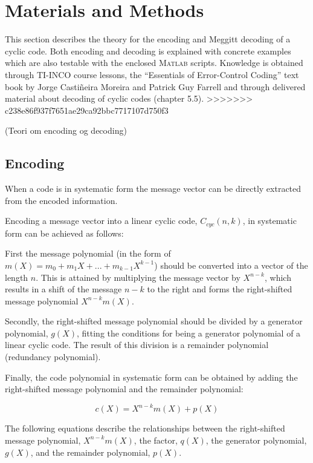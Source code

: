 \documentclass[Main]{subfiles}
\begin{document}
\section{Materials and Methods}
This section describes the theory for the encoding and Meggitt decoding of a cyclic code. Both encoding and decoding is explained with concrete examples which are also testable with the enclosed \textsc{Matlab} scripts. Knowledge is obtained through TI-INCO course lessons, the ``Essentials of Error-Control Coding'' text book by Jorge Casti\~{n}eira Moreira and Patrick Guy Farrell and through delivered material about decoding of cyclic codes (chapter 5.5).
>>>>>>> c238e86f937f7651ae29ca92bbc7717107d750f3

(Teori om encoding og decoding)
\subsection{Encoding}
\noindent When a code is in systematic form the message vector can be directly extracted from the encoded information. 

\noindent Encoding a message vector into a linear cyclic code, $C_{cyc}(n,k)$, in systematic form can be achieved as follows:

\noindent First the message polynomial (in the form of $m(X) = m_{0} + m_{1}X+...+m_{k-1}X^{k-1}$) should be converted into a vector of the length $n$. This is attained by multiplying the message vector by $X^{n-k}$, which results in a shift of the message $n-k$ to the right and forms the right-shifted message polynomial $X^{n-k}m(X)$.

\noindent Secondly, the right-shifted message polynomial should be divided by a generator polynomial, $g(X)$, fitting the conditions for being a generator polynomial of a linear cyclic code. The result of this division is a remainder polynomial (redundancy polynomial).

\noindent Finally, the code polynomial in systematic form can be obtained by adding the right-shifted message polynomial and the remainder polynomial: 

\begin{equation}
c(X) = X^{n-k}m(X)+p(X)
\label{eq:code polynomail formular}
\end{equation}

\noindent The following equations describe the relationships between the right-shifted message polynomial, $X^{n-k}m(X)$, the factor, $q(X)$, the generator polynomial, $g(X)$, and the remainder polynomial, $p(X)$.  
\end{document}
